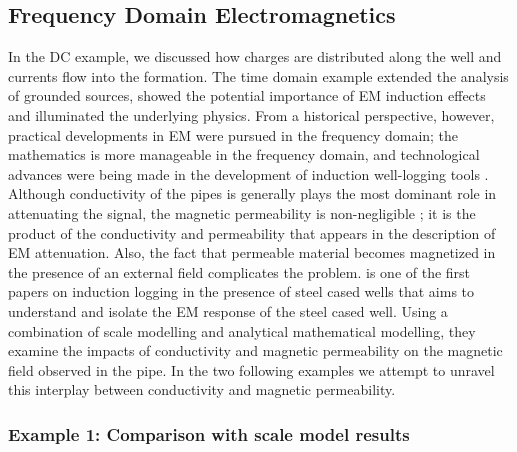 

\subsection{Frequency Domain Electromagnetics}
\label{sec:FDEM}

In the DC example, we discussed how charges are distributed along the well and currents flow into the formation. The time domain example extended the analysis of grounded sources, showed the potential importance of EM induction effects and illuminated the underlying physics. From a historical perspective, however, practical developments in EM were pursued in the frequency domain; the mathematics is more manageable in the frequency domain, and technological advances were being made in the development of induction well-logging tools \citep{Doll1949, Moran1962}. Although conductivity of the pipes is generally plays the most dominant role in attenuating the signal, the magnetic permeability is non-negligible \citep{Wait1977}; it is the product of the conductivity and permeability that appears in the description of EM attenuation. Also, the fact that permeable material becomes magnetized in the presence of an external field complicates the problem.
\cite{Augustin1989} is one of the first papers on induction logging in the presence of steel cased wells that aims to understand and isolate the EM response of the steel cased well. Using a combination of scale modelling and analytical mathematical modelling, they examine the impacts of conductivity and magnetic permeability on the magnetic field observed in the pipe. In the two following examples we attempt to unravel this interplay between conductivity and magnetic permeability.


\subsubsection{Example 1: Comparison with scale model results}

